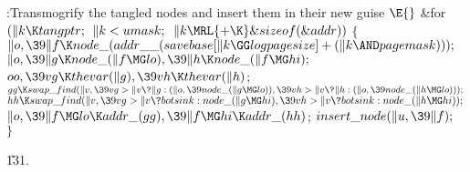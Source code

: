 \Y\B\4:Transmogrify the tangled nodes and insert them in their new guise%
\X${}\E{}$\6
\&{for} ${}(\|k\K\\{tangptr};{}$ ${}\|k<\\{umask};{}$ ${}\|k\MRL{+{\K}}%
\&{sizeof}(\&{addr})){}$\5
${}\{{}$\1\6
${}\|o,\39\|f\K\\{node\_}(\\{addr\_\_}(\\{savebase}[\|k\GG\\{logpagesize}]+(\|k%
\AND\\{pagemask})));{}$\6
${}\|o,\39\|g\K\\{node\_}(\|f\MG\\{lo}),\39\|h\K\\{node\_}(\|f\MG\\{hi});{}$\6
${}\\{oo},\39\\{vg}\K\\{thevar}(\|g),\39\\{vh}\K\\{thevar}(\|h){}$;\6
${}\\{gg}\K\\{swap\_find}(\|v,\39\\{vg}>\|v\?\|g:(\|o,\39\\{node\_}(\|g\MG%
\\{lo})),\39\\{vh}>\|v\?\|h:(\|o,\39\\{node\_}(\|h\MG\\{lo})));{}$\6
${}\\{hh}\K\\{swap\_find}(\|v,\39\\{vg}>\|v\?\\{botsink}:\\{node\_}(\|g\MG%
\\{hi}),\39\\{vh}>\|v\?\\{botsink}:\\{node\_}(\|h\MG\\{hi}));{}$\6
${}\|o,\39\|f\MG\\{lo}\K\\{addr\_}(\\{gg}),\39\|f\MG\\{hi}\K\\{addr\_}(%
\\{hh}){}$;\6
${}\\{insert\_node}(\|u,\39\|f);{}$\6
\4${}\}{}$\2\par
\U131.\fi


